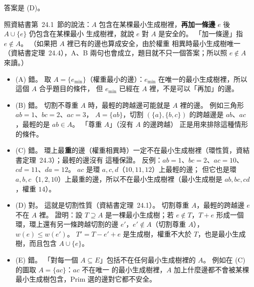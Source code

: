 \begin{pastsoln}
答案是 (D)。

照資結書第~24.1~節的說法：$A$ 包含在某棵最小生成樹裡，\textbf{再加一條邊} $e$ 後 $A \cup \{e\}$ 仍包含在某棵最小
生成樹裡，就說 $e$ 對 $A$ 是安全的。 「加一條邊」指 $e \notin A$。 （如果把 $A$ 裡已有的邊也算成安全，由於權重
相異時最小生成樹唯一（資結書定理~24.4），A、B 兩句也會成立，題目就不只一個答案；所以照 $e \notin A$ 來讀。）
\begin{itemize}
\item (A) 錯。 取 $A = \{e_{\min}\}$（權重最小的邊）：$e_{\min}$ 在唯一的最小生成樹裡，所以這個 $A$ 合乎題目的條件，
但 $e_{\min}$ 已經在 $A$ 裡，不是可以「再加」的邊。
\item (B) 錯。 切割不尊重 $A$ 時，最輕的跨越邊可能就是 $A$ 裡的邊。 例如三角形 $ab = 1$、$bc = 2$、$ac = 3$，
$A = \{ab\}$，切割 $(\{a\}, \{b, c\})$ 的跨越邊是 $ab$、$ac$，最輕的是 $ab \in A$。 「尊重 $A$」（沒有 $A$ 的邊跨越）
正是用來排除這種情形的條件。
\item (C) 錯。 環上最\textbf{重}的邊（權重相異時）一定不在最小生成樹裡（環性質，資結書定理~24.3）；最輕的邊沒有
這種保證。 反例：$ab = 1$、$bc = 2$、$ac = 10$、$cd = 11$、$da = 12$。 $ac$ 是環 $a, c, d$（$10, 11, 12$）上最輕的邊；
但它也是環 $a, b, c$（$1, 2, 10$）上最重的邊，所以不在最小生成樹裡（最小生成樹是 $ab, bc, cd$，權重 $14$）。
\item (D) 對。 這就是切割性質（資結書定理~24.1）。 切割尊重 $A$，最輕的跨越邊 $e$ 不在 $A$ 裡。 證明：設 $T \supseteq A$
是一棵最小生成樹；若 $e \notin T$，$T + e$ 形成一個環，環上還有另一條跨越切割的邊 $e'$，$e' \notin A$（切割尊重 $A$），
$w(e) \le w(e')$。 $T' = T - e' + e$ 是生成樹，權重不大於 $T$，也是最小生成樹，而且包含 $A \cup \{e\}$。
\item (E) 錯。 「對每一個 $A \subseteq E$」包括不在任何最小生成樹裡的 $A$。 例如在 (C) 的圖取 $A = \{ac\}$：$ac$ 不在唯一
的最小生成樹裡，$A$ 加上什麼邊都不會被某棵最小生成樹包含，Prim 選的邊對它都不安全。
\end{itemize}
\end{pastsoln}
